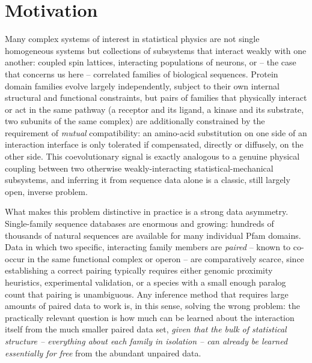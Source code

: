 \documentclass[11pt]{article}
\begin{document}
\section{Motivation}
\label{sec:motivation}

Many complex systems of interest in statistical physics are not single
homogeneous systems but collections of subsystems that interact weakly
with one another: coupled spin lattices, interacting populations of
neurons, or -- the case that concerns us here -- correlated families of
biological sequences. Protein domain families evolve largely
independently, subject to their own internal structural and functional
constraints, but pairs of families that physically interact or act in the
same pathway (a receptor and its ligand, a kinase and its substrate, two
subunits of the same complex) are additionally constrained by the
requirement of \emph{mutual} compatibility: an amino-acid substitution on
one side of an interaction interface is only tolerated if compensated,
directly or diffusely, on the other side. This coevolutionary signal is
exactly analogous to a genuine physical coupling between two otherwise
weakly-interacting statistical-mechanical subsystems, and inferring it
from sequence data alone is a classic, still largely open, inverse
problem.

What makes this problem distinctive in practice is a strong data
asymmetry. Single-family sequence databases are enormous and growing:
hundreds of thousands of natural sequences are available for many
individual Pfam domains. Data in which two specific, interacting family
members are \emph{paired} -- known to co-occur in the same functional
complex or operon -- are comparatively scarce, since establishing a
correct pairing typically requires either genomic proximity heuristics,
experimental validation, or a species with a small enough paralog count
that pairing is unambiguous. Any inference method that requires large
amounts of paired data to work is, in this sense, solving the wrong
problem: the practically relevant question is how much can be learned
about the interaction itself from the much smaller paired data set,
\emph{given that the bulk of statistical structure -- everything about
each family in isolation -- can already be learned essentially for free}
from the abundant unpaired data.
\end{document}
